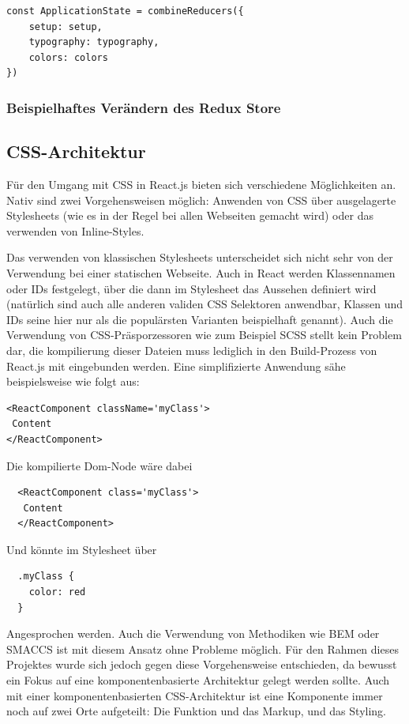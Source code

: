 \begin{lstlisting}[caption={Zusammenfügen der dedizierten Reducer zu einem Objekt}, label=lst:combine_reducer]
  const ApplicationState = combineReducers({
    setup: setup,
    typography: typography,
    colors: colors
})
\end{lstlisting}

\subsubsection{Beispielhaftes Verändern des Redux Store}


\subsection{CSS-Architektur}
Für den Umgang mit CSS in React.js bieten sich verschiedene Möglichkeiten an. Nativ sind zwei Vorgehensweisen möglich: Anwenden von CSS über ausgelagerte Stylesheets (wie es in der Regel bei allen Webseiten gemacht wird) oder das verwenden von Inline-Styles.

Das verwenden von klassischen Stylesheets unterscheidet sich nicht sehr von der Verwendung bei einer statischen Webseite. Auch in React werden Klassennamen oder IDs festgelegt, über die dann im Stylesheet das Aussehen definiert wird (natürlich sind auch alle anderen validen CSS Selektoren anwendbar, Klassen und IDs seine hier nur als die populärsten Varianten beispielhaft genannt).
Auch die Verwendung von CSS-Präsporzessoren wie zum Beispiel SCSS stellt kein Problem dar, die kompilierung dieser Dateien muss lediglich in den Build-Prozess von React.js mit eingebunden werden. Eine simplifizierte Anwendung sähe beispielsweise wie folgt aus:

\begin{lstlisting}
<ReactComponent className='myClass'>
 Content
</ReactComponent>
\end{lstlisting}

Die kompilierte Dom-Node wäre dabei

\begin{lstlisting}
  <ReactComponent class='myClass'>
   Content
  </ReactComponent>
\end{lstlisting}

Und könnte im Stylesheet über

\begin{lstlisting}
  .myClass {
    color: red
  }
\end{lstlisting}

Angesprochen werden. Auch die Verwendung von Methodiken wie BEM oder SMACCS ist mit diesem Ansatz ohne Probleme möglich.
Für den Rahmen dieses Projektes wurde sich jedoch gegen diese Vorgehensweise entschieden, da bewusst ein Fokus auf eine komponentenbasierte Architektur gelegt werden sollte. Auch mit einer komponentenbasierten CSS-Architektur ist eine Komponente immer noch auf zwei Orte aufgeteilt: Die Funktion und das Markup, und das Styling.

